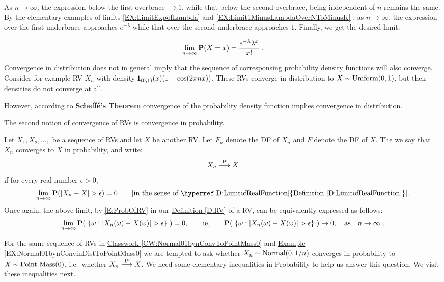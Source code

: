\begin{example}
As $n \to \infty$, the expression below the first overbrace $\to 1$, while that below the second overbrace, being independent of $n$ remains the same.  By the elementary examples of limits
\ref*{EX:LimitExpofLambda} and \ref*{EX:Limit1MinusLambdaOverNToMinusK}%
, as $n \to \infty$, the expression over the first underbrace approaches $e^{-\lambda}$ while that over the second underbrace approaches $1$.  Finally, we get the desired limit:

\[
\lim_{n \to \infty} \mathbf{P}(X=x)
= \frac{ e^{-\lambda} \lambda^x}{x!}  \ .
\]
\end{example}

\begin{rem}
Convergence in distribution does not in general imply that the sequence of corresponsing probability density functions will also converge. 
Consider for example RV $X_n$ with density ${1}\mspace{-11 mu}{1}_{(0,1)}(x)(1-\cos(2\pi n x))$. 
These RVs converge in distribution to $X \sim \mbox{{\rm Uniform}}(0,1)$, but their densities do not converge at all.

However, according to {\bf Scheff\'e's Theorem} convergence of the probability density function implies convergence in distribution.
\end{rem}

The second notion of convergence of RVs is convergence in probability.

\begin{definition}\label{D:ConvInProb}
Let $X_1,X_2,\ldots,$ be a sequence of RVs and let $X$ be another RV.  Let $F_n$ denote the DF of $X_n$ and $F$ denote the DF of $X$.  The we say that $X_n$ converges to $X$ in probability, and write:
\[
X_n \overset{\mathbf{P}}{\longrightarrow} X
\]
if for every real number $\epsilon > 0$,
\[
\lim_{n \rightarrow \infty} \p(|X_n-X|> \epsilon) = 0 \qquad \text{[in the sense of \hyperref[D:LimitofRealFunction]{Definition \ref*{D:LimitofRealFunction}}].}
\]
Once again, the above limit, by \eqref{E:ProbOfRV} in our \hyperref[D:RV]{Definition \ref*{D:RV}} of a RV, can be equivalently expressed as follows: 
\[
\lim_{n \rightarrow \infty} \mathbf{P}( \ \{\omega: |X_n(\omega) - X(\omega)| > \epsilon\} \ )=0, \qquad \text{ie,} \qquad \mathbf{P}( \ \{\omega: |X_n(\omega) - X(\omega)| > \epsilon\} \ ) \rightarrow 0, \quad \text{as} \quad n \rightarrow \infty \ .
\]
\end{definition}
 
For the same sequence of RVs in  \hyperref[CW:Normal01bynConvToPointMass0]{Classwork \ref*{CW:Normal01bynConvToPointMass0}} and \hyperref[EX:Normal01bynConvinDistToPointMass0]{Example \ref*{EX:Normal01bynConvinDistToPointMass0}} we are tempted to ask whether $X_n \sim \mbox{{\rm Normal}}(0,1/n)$ converges in probability to $X \sim \mbox{{\rm Point~Mass}}(0)$, i.e.~whether $X_n \overset{\mathbf{P}}{\longrightarrow} X$.  We need some elementary inequalities in Probability to help us answer this question.  We visit these inequalities next.


